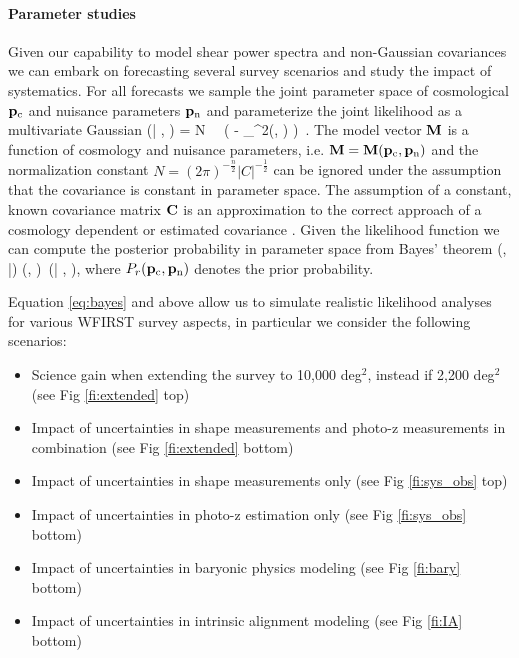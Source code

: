 \paragraph* {Parameter studies}
Given our capability to model shear power spectra and non-Gaussian covariances we can embark on forecasting several survey scenarios and study the impact of systematics. For all forecasts we sample the joint parameter space of cosmological $\mathbf p_\mathrm{c}$ and nuisance parameters $\mathbf p_\mathrm{n}$ and parameterize the joint likelihood as a multivariate Gaussian 
\be
\label{eq:like}
\like (\D| \pco, \pnu) = N \, \times \, \exp \biggl( - _{\chi^2(\pco, \pnu)}  \biggr) \,.
\ee
The model vector $\mathbf M$ is a function of cosmology and nuisance parameters, i.e. $\mathbf M=\mathbf M(\mathbf p_\mathrm{c}, \mathbf p_\mathrm{n})$ and the normalization constant $N=(2 \pi)^{-\frac{n}{2}} |C|^{-\frac{1}{2}}$ can be ignored under the assumption that the covariance is constant in parameter space. The assumption of a constant, known covariance matrix $\mathbf C$ is an approximation to the correct approach of a cosmology dependent or estimated covariance \citep[see][for further details]{esh09, seh15}.     
Given the likelihood function we can compute the posterior probability in parameter space from Bayes' theorem
\be
\label{eq:bayes}
\prob(\pco, \pnu|\D) \propto \probr (\pco, \pnu) \,\like (\D| \pco, \pnu),
\ee
where $P_r (\mathbf p_\mathrm{c}, \mathbf p_\mathrm{n})$ denotes the prior probability.

Equation \ref{eq:bayes} and above allow us to simulate realistic likelihood analyses for various WFIRST survey aspects, in particular we consider the following scenarios:
\begin{itemize}
\item Science gain when extending the survey to 10,000 deg$^2$, instead if 2,200 deg$^2$ (see Fig \ref{fi:extended} top)
\item Impact of uncertainties in shape measurements and photo-z measurements in combination (see Fig \ref{fi:extended} bottom)
\item Impact of uncertainties in shape measurements only (see Fig \ref{fi:sys_obs} top)
\item Impact of uncertainties in photo-z estimation only (see Fig \ref{fi:sys_obs} bottom)
\item Impact of uncertainties in baryonic physics modeling (see Fig \ref{fi:bary} bottom)
\item Impact of uncertainties in intrinsic alignment modeling (see Fig \ref{fi:IA} bottom) 
\end{itemize}

